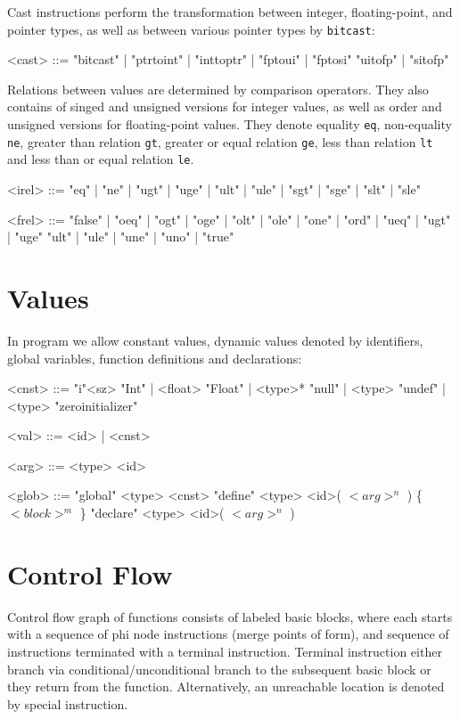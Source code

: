 \noindent
Cast instructions perform the transformation between integer, floating-point,
and pointer types, as well as between various pointer types by \texttt{bitcast}:

\begin{grammar}
<cast>  ::= "bitcast" | "ptrtoint" | "inttoptr" | "fptoui" | "fptosi" \alt
           "uitofp"  | "sitofp"
\end{grammar}

\noindent
Relations between \llvm values are determined by comparison operators. They
also contains of singed and unsigned versions for integer values, as well as
order and unsigned versions for floating-point values. They denote equality
\texttt{eq}, non-equality \texttt{ne}, greater than relation \texttt{gt},
greater or equal relation \texttt{ge}, less than relation \texttt{lt} and less
than or equal relation \texttt{le}.

\begin{grammar}
<irel> ::= "eq" | "ne" | "ugt" | "uge" | "ult" | "ule" | "sgt" | "sge" | "slt" | "sle"

<frel> ::= "false" | "oeq" | "ogt" | "oge" | "olt" | "ole" | "one" | "ord" | "ueq" | "ugt" | "uge"
    \alt "ult" | "ule" | "une" | "uno" | "true"
\end{grammar}

\section*{Values}

In \llvm program we allow constant values, dynamic values denoted by
identifiers, global variables, function definitions and declarations:

\begin{grammar}
<cnst> ::= "i"<sz> "Int" | <float> "Float" | <type>* "null" | <type> "undef" |
    \alt <type> "zeroinitializer"

<val> ::= <id> | <cnst>

<arg> ::= <type> <id>

<glob> ::= "global" <type> <cnst>
    \alt "define" <type> <id>( $<arg>^n$ ) \{ $<block>^m$ \}
    \alt "declare" <type> <id>( $<arg>^n$ )
\end{grammar}

\section*{Control Flow}

Control flow graph of \llvm functions consists of labeled basic blocks, where
each starts with a sequence of phi node instructions (merge points of \ssa
form), and sequence of instructions terminated with a terminal instruction.
Terminal instruction either branch via conditional/uncon\-di\-tio\-nal branch to the
subsequent basic block or they return from the function. Alternatively, an
unreachable location is denoted by special instruction.

